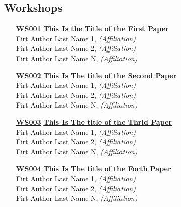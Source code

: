 \subsection{Workshops}
\begin{enumerate}
\item[\href{https://doi.org/10.1145/1122445.1122456}{\textbf{WS001}}]
\href{https://doi.org/10.1145/1122445.1122456}{\textbf{This Is the Title of the First Paper}}\\
Firt Author Last Name 1, \emph{(Affiliation)}\\
Firt Author Last Name 2, \emph{(Affiliation)}\\
Firt Author Last Name N, \emph{(Affiliation)}\\

\item[\href{https://doi.org/10.1145/1122445.1122456}{\textbf{WS002}}]
\href{https://doi.org/10.1145/1122445.1122456}{\textbf{This Is The title of the Second Paper}}\\
Firt Author Last Name 1, \emph{(Affiliation)}\\
Firt Author Last Name 2, \emph{(Affiliation)}\\
Firt Author Last Name N, \emph{(Affiliation)}\\

\item[\href{https://doi.org/10.1145/1122445.1122456}{\textbf{WS003}}]
\href{https://doi.org/10.1145/1122445.1122456}{\textbf{This Is The title of the Thrid Paper}}\\
Firt Author Last Name 1, \emph{(Affiliation)}\\
Firt Author Last Name 2, \emph{(Affiliation)}\\
Firt Author Last Name N, \emph{(Affiliation)}\\

\item[\href{https://doi.org/10.1145/1122445.1122456}{\textbf{WS004}}]
\href{https://doi.org/10.1145/1122445.1122456}{\textbf{This Is The title of the Forth Paper}}\\
Firt Author Last Name 1, \emph{(Affiliation)}\\
Firt Author Last Name 2, \emph{(Affiliation)}\\
Firt Author Last Name N, \emph{(Affiliation)}\\
\end{enumerate}
